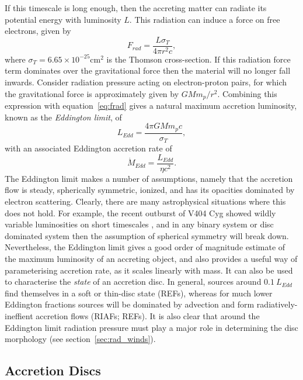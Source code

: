 If this timescale is long enough, then the accreting matter
can radiate its potential energy with luminosity $L$. 
This radiation can induce a force on free electrons, given by
\begin{equation}
F_{rad} = \frac{L \sigma_T}{4 \pi r^2 c},
\label{eq:frad}
\end{equation} 
where $\sigma_T = 6.65\times10^{-25}$cm$^2$ is the Thomson cross-section.
If this radiation force term dominates over the gravitational
force then the material will no longer fall inwards. Consider
radiation pressure acting on electron-proton pairs, for which the gravitational
force is approximately given by $G M m_p / r^2$. Combining this expression
with equation~\ref{eq:frad} gives a natural
maximum accretion luminosity, known as the {\em Eddington limit}, of
\begin{equation}
L_{Edd} = \frac{4 \pi G M m_p c}{\sigma_T},
\label{eq:bondi}
\end{equation} 
with an associated Eddington accretion rate of 
\begin{equation}
\dot{M}_{Edd} = \frac{L_{Edd}}{\eta c^2}.
\label{eq:bondi}
\end{equation} 
The Eddington limit makes a number of assumptions, namely
that the accretion flow is steady, spherically symmetric, ionized,
and has its opacities dominated by electron scattering.
Clearly, there are many astrophysical situations where this does not hold.
For example, the recent outburst of V404 Cyg showed wildly variable
luminosities on short timescales 
\citep[see, e.g.,][among many, many ATels]{kuulkers_atel2015,motta_atel2015}, 
and in any binary system
or disc dominated system then the assumption of spherical symmetry will
break down. Nevertheless, the Eddington limit gives a good order of magnitude 
estimate of the maximum luminosity of an accreting object,
and also provides a useful way of parameterising accretion rate,
as it scales linearly with mass. It can also be used
to characterise the {\em state} of an accretion disc.  
In general, sources around $0.1~L_{Edd}$ find themselves in a 
soft or thin-disc state (REFs), whereas for much lower Eddington 
fractions sources will be dominated by advection and form radiatively-ineffient
accretion flows (RIAFs; REFs).
It is also clear that around the Eddington limit radiation pressure
must play a major role in determining the disc morphology 
(see section~\ref{sec:rad_winds}).

\subsection{Accretion Discs}

